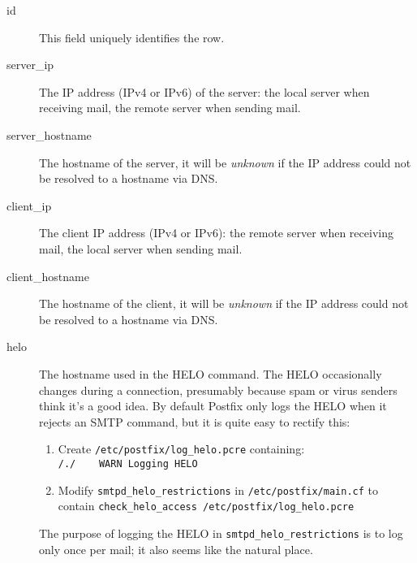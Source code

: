 \documentclass[a4paper,12pt,draft]{article}
\begin{document}
\begin{description}

    \item [id] This field uniquely identifies the row.

    \item [server\_ip] The IP address (IPv4 or IPv6) of the server: the
        local server when receiving mail, the remote server when sending
        mail.

    \item [server\_hostname] The hostname of the server, it will be
        \textit{unknown\/} if the IP address could not be resolved to a
        hostname via DNS\@.

    \item [client\_ip] The client IP address (IPv4 or IPv6): the remote
        server when receiving mail, the local server when sending mail.

    \item [client\_hostname] The hostname of the client, it will be
        \textit{unknown\/} if the IP address could not be resolved to a
        hostname via DNS\@.

    \item [helo] The hostname used in the HELO command.  The HELO
        occasionally changes during a connection, presumably because spam
        or virus senders think it's a good idea.  By default Postfix only
        logs the HELO when it rejects an SMTP command, but it is quite easy
        to rectify this: 

\label{logging helo}

        \begin{enumerate}

            \item Create \texttt{/etc/postfix/log\_helo.pcre}
                containing:\newline
                \hspace*{2em}\texttt{/./~~~~WARN~Logging~HELO}

            \item Modify \texttt{smtpd\_helo\_restrictions} in
                \texttt{/etc/postfix/main.cf} to contain\newline
                \hspace*{2em}\texttt{check\_helo\_access~/etc/postfix/log\_helo.pcre}

        \end{enumerate}

        The purpose of logging the HELO in
        \texttt{smtpd\_helo\_restrictions} is to log only once per mail; it
        also seems like the natural place.


\end{description}
\end{document}
